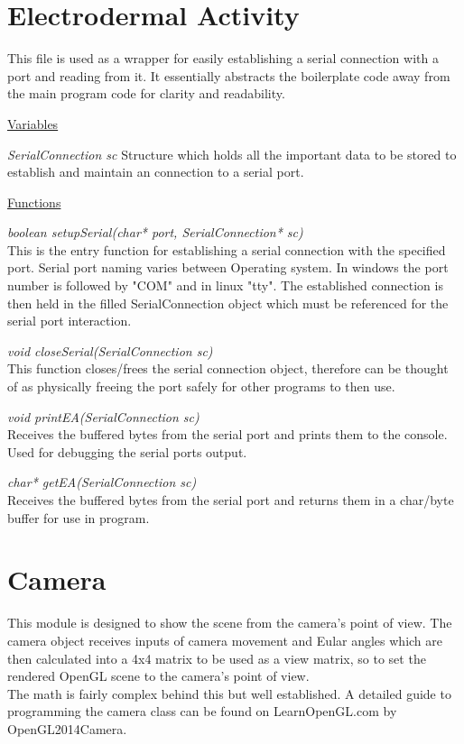 \documentclass{report}
\begin{document}
\section{Electrodermal Activity}
This file is used as a wrapper for easily establishing a serial connection with a port and reading from it. It essentially abstracts the 
boilerplate code away from the main program code for clarity and readability.

\noindent\underline{Variables}

\textit{SerialConnection sc}
Structure which holds all the important data to be stored to establish and maintain an connection to a serial port.

\noindent\underline{Functions}

\textit{boolean setupSerial(char* port, SerialConnection* sc)}\\
This is the entry function for establishing a serial connection with the specified port.
Serial port naming varies between Operating system. In windows the port number is followed by "COM" and in linux "tty". The established 
connection is then held in the filled SerialConnection object which must be referenced for the serial port interaction.

\noindent\textit{void closeSerial(SerialConnection sc)}\\
This function closes/frees the serial connection object, therefore can be thought of as physically freeing
the port safely for other programs to then use.

\noindent\textit{void printEA(SerialConnection sc)}\\
Receives the buffered bytes from the serial port and prints them to the console. Used for debugging the serial ports output.

\noindent\textit{char* getEA(SerialConnection sc)}\\
Receives the buffered bytes from the serial port and returns them in a char/byte buffer for use in program.

\section{Camera}
This module is designed to show the scene from the camera's point of view. The camera object receives inputs of camera movement and Eular angles
which are then calculated into a 4x4 matrix to be used as a view matrix, so to set the rendered OpenGL scene to the camera's point of view.\\
The math is fairly complex behind this but well established. A detailed guide to programming the camera class can be found on LearnOpenGL.com by OpenGL2014Camera.
\end{document}

